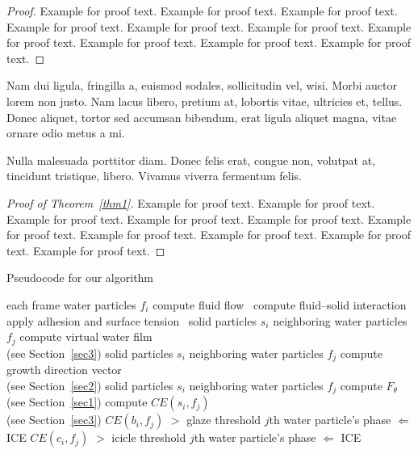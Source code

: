\documentclass[proof]{WileyASNA-v1}
\begin{document}
\begin{proof}
Example for proof text. Example for proof text. Example for proof text. Example for proof text. Example for proof text. Example for proof text. Example for proof text. Example for proof text. Example for proof text. Example for proof text. 
\end{proof}

Nam dui ligula, fringilla a, euismod sodales, sollicitudin vel, wisi. Morbi auctor lorem non justo. Nam lacus libero,
pretium at, lobortis vitae, ultricies et, tellus. Donec aliquet, tortor sed accumsan bibendum, erat ligula aliquet magna,
vitae ornare odio metus a mi. 

Nulla malesuada porttitor diam. Donec felis erat, congue non, volutpat at, tincidunt tristique, libero. Vivamus
viverra fermentum felis. 

\begin{proof}[Proof of Theorem~\ref{thm1}]
Example for proof text. Example for proof text. Example for proof text. Example for proof text. Example for proof text. Example for proof text. Example for proof text. Example for proof text. Example for proof text. Example for proof text. 
\end{proof}

\begin{algorithm}
\caption{Pseudocode for our algorithm}\label{alg1}
\begin{algorithmic}
  \For each frame
  \For water particles $f_{i}$
  \State compute fluid flow~\cite{Strunk1979}
  \State compute fluid--solid interaction~\cite{Paivio1975}
  \State apply adhesion and surface tension~\cite{Rutten2007}
  \EndFor
   \For solid particles $s_{i}$
   \For neighboring water particles $f_{j}$
   \State compute virtual water film \\(see Section~\ref{sec3})
   \EndFor
   \EndFor
   \For solid particles $s_{i}$
   \For neighboring water particles $f_{j}$
   \State compute growth direction vector \\(see Section~\ref{sec2})
   \EndFor
   \EndFor
   \For solid particles $s_{i}$
   \For neighboring water particles $f_{j}$
   \State compute $F_{\theta}$ (see Section~\ref{sec1})
   \State compute $CE(s_{i},f_{j})$ \\(see Section~\ref{sec3})
   \If $CE(b_{i}, f_{j})$ $>$ glaze threshold
   \State $j$th water particle's phase $\Leftarrow$ ICE
   \EndIf
   \If $CE(c_{i}, f_{j})$ $>$ icicle threshold
   \State $j$th water particle's phase $\Leftarrow$ ICE
   \EndIf
   \EndFor
   \EndFor
  \EndFor
\end{algorithmic}
\end{algorithm}
\end{document}
